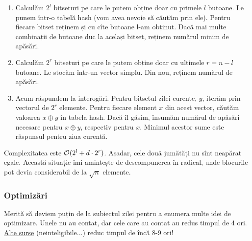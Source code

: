 \documentclass[../main.tex]{subfiles}
\begin{document}
\begin{enumerate}
  \item Calculăm $2^l$ bitseturi pe care le putem obține doar cu primele $l$ butoane. Le punem într-o tabelă hash (vom avea nevoie să căutăm prin ele). Pentru fiecare bitset reținem și cu cîte butoane l-am obținut. Dacă mai multe combinații de butoane duc la același bitset, reținem numărul minim de apăsări.

  \item Calculăm $2^r$ bitseturi pe care le putem obține doar cu ultimele $r=n-l$ butoane. Le stocăm într-un vector simplu. Din nou, reținem numărul de apăsări.

  \item Acum răspundem la interogări. Pentru bitsetul zilei curente, $y$, iterăm prin vectorul de $2^r$ elemente. Pentru fiecare element $x$ din acest vector, căutăm valoarea $x \oplus y$ în tabela hash. Dacă îl găsim, însumăm numărul de apăsări necesare pentru $x \oplus y$, respectiv pentru $x$. Minimul acestor sume este răspunsul pentru ziua curentă.
\end{enumerate}

Complexitatea este $\mathcal{O}(2^l + d \cdot 2^r)$. Așadar, cele două jumătăți nu sînt neapărat egale.  Această situație îmi amintește de descompunerea în radical, unde blocurile pot devia considerabil de la $\sqrt{n}$ elemente.

\subsubsection*{Optimizări}

Merită să deviem puțin de la subiectul zilei pentru a enumera multe idei de optimizare. Unele nu au contat, dar cele care au contat au redus timpul de 4 ori. \href{https://codeforces.com/contest/1423/status?order=BY_CONSUMED_TIME_ASC}{Alte surse} (neinteligibile...) reduc timpul de încă 8-9 ori!
\end{document}
